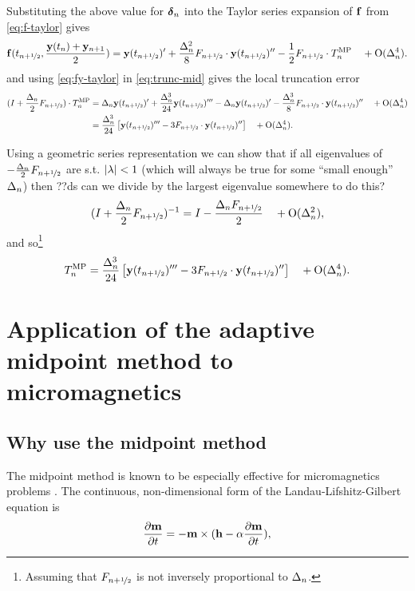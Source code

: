 Substituting the above value for $\mbox{\boldmath$\delta$}_{n}$ into the Taylor series expansion of ${\mathbf{f}}$ from \eqref{eq:f-taylor} gives
\begin{equation}
  {\mathbf{f}}(t_{n+\nicefrac{1}{2}}, \frac{\mathbf{y}(t_n) + \mathbf{y}_{n+1}}{2}) = \mathbf{y}(t_{n+\nicefrac{1}{2}})'
  + \frac{\Delta_{n}^2}{8} F_{n+\nicefrac{1}{2}} \cdot \mathbf{y}(t_{n+\nicefrac{1}{2}})'' - \frac{1}{2} F_{n+\nicefrac{1}{2}} \cdot T_n^{\text{MP}} \quad + \text{O}(\Delta_{n}^4)
  . \label{eq:fy-taylor}
\end{equation}
and using \eqref{eq:fy-taylor} in \eqref{eq:trunc-mid} gives the local truncation error
\begin{align}
  (I + \frac{\Delta_{n}}{2}F_{n+\nicefrac{1}{2}}) \cdot T_n^{\text{MP}}
  &= \Delta_{n} \mathbf{y}(t_{n+\nicefrac{1}{2}})' + \frac{\Delta_{n}^3}{24} \mathbf{y}(t_{n+\nicefrac{1}{2}})'''
  - \Delta_{n} \mathbf{y}(t_{n+\nicefrac{1}{2}})'
  - \frac{\Delta_{n}^3}{8} F_{n+\nicefrac{1}{2}} \cdot \mathbf{y}(t_{n+\nicefrac{1}{2}})'' \quad + \text{O}(\Delta_{n}^4)
  \notag \\
  &= \frac{\Delta_{n}^3}{24} \left[\mathbf{y}(t_{n+\nicefrac{1}{2}})''' - 3 F_{n+\nicefrac{1}{2}} \cdot \mathbf{y}(t_{n+\nicefrac{1}{2}})'' \right]
  \quad + \text{O}(\Delta_{n}^4).
  \label{eq:trunc-implicit-form}
\end{align}

Using a geometric series representation we can show that if all eigenvalues of  $-\frac{\Delta_{n}}{2}F_{n+\nicefrac{1}{2}}$ are s.t. $\lvert \lambda \rvert < 1$\cite{??ds} (which will always be true for some ``small enough'' $\Delta_{n}$) then
??ds can we divide by the largest eigenvalue somewhere to do this?
\begin{equation}
  (I + \frac{\Delta_{n}}{2}F_{n+\nicefrac{1}{2}})^{-1} = I - \frac{\Delta_{n} F_{n+\nicefrac{1}{2}}}{2}  \quad + \text{O}(\Delta_{n}^2),
\end{equation}
and so\footnote{Assuming that $F_{n+\nicefrac{1}{2}}$ is not inversely proportional to $\Delta_{n}$.}
\begin{equation}
  T_n^{\text{MP}} = \frac{\Delta_{n}^3}{24} \left[\mathbf{y}(t_{n+\nicefrac{1}{2}})''' - 3 F_{n+\nicefrac{1}{2}} \cdot \mathbf{y}(t_{n+\nicefrac{1}{2}})'' \right]
  \quad +\text{O}(\Delta_{n}^4).
  \label{eq:trunc-final}
\end{equation}



\section{Application of the adaptive midpoint method to micromagnetics}


\subsection{Why use the midpoint method}

The midpoint method is known to be especially effective for micromagnetics problems \cite{DAquino2005}.
The continuous, non-dimensional form of the Landau-Lifshitz-Gilbert equation is
\begin{equation}
  \label{eq:llg-prop-form}
  \frac{\partial \mathbf{m}}{\partial t} = - \mathbf{m} \times( \mathbf{h} - \alpha \frac{\partial \mathbf{m}}{\partial t}),
\end{equation}

